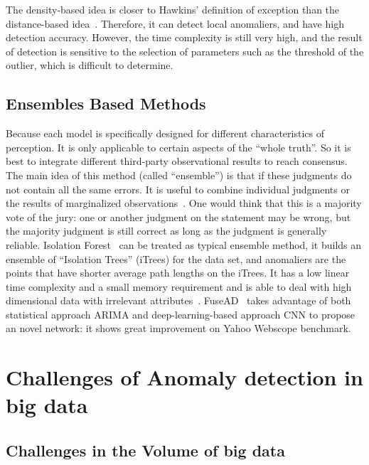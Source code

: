 The density-based idea is closer to Hawkins' definition of
exception than the distance-based idea~\cite{hawkins1980identification}.
Therefore,
it can detect local anomaliers,
and have high detection accuracy.
However,
the time complexity is still very high,
and the result of detection is sensitive to
the selection of parameters such as the threshold of the outlier,
which is difficult to determine.

\subsection{Ensembles Based Methods}

Because each model is specifically designed
for different characteristics of perception.
It is only applicable to certain aspects of
the ``whole truth''.
So it is best to integrate different
third-party observational results to reach consensus.
The main idea of this method (called ``ensemble'')
is that if these judgments do not contain
all the same errors.
It is useful to combine individual judgments or
the results of marginalized observations~\cite{zhou2012ensemble}.
One would think that this is a majority vote of
the jury:
one or another judgment on the statement may be wrong,
but the majority judgment is still correct as long as
the judgment is generally reliable.
Isolation Forest~\cite{liu2008isolation}
can be treated as typical ensemble method,
it builds an ensemble of “Isolation Trees” (iTrees) for
the data set,
and anomaliers are the points that
have shorter average path lengths on the iTrees.
It has a low linear time complexity and
a small memory requirement
and is able to deal with high dimensional data with irrelevant attributes~\cite{chandola2009anomaly}.
FuseAD~\cite{munir2019fusead}
takes advantage of both statistical approach ARIMA
and deep-learning-based approach
CNN to propose an novel network:
it shows great improvement on Yahoo Webscope benchmark.

\section{Challenges of Anomaly detection in big data}
\label{sec-challenge-big}

\subsection{Challenges in the Volume of big data}


